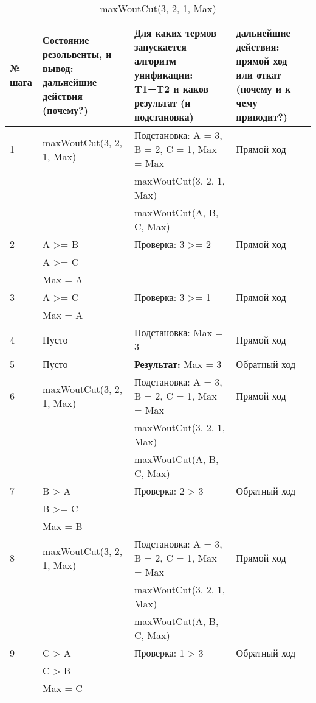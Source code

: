 {
\small
\begin{longtable}{|p{1.15cm}|p{4cm}|p{6cm}|p{6cm}|}
    \caption{maxWoutCut(3, 2, 1, Max)} \\
    \hline
    № шага & Состояние резольвенты, и вывод: дальнейшие действия (почему?) & Для каких термов запускается алгоритм унификации: T1=T2 и каков результат (и подстановка) & дальнейшие действия: прямой ход или откат (почему и к чему приводит?) \\
    \hline
    1 & maxWoutCut(3, 2, 1, Max) & Подстановка: A = 3, B = 2, C = 1, Max = Max & Прямой ход \\
      & & maxWoutCut(3, 2, 1, Max) & \\
      & & maxWoutCut(A, B, C, Max) & \\
    \hline
    2 & A >= B & Проверка: 3 >= 2 & Прямой ход \\
      & A >= C & & \\
      & Max = A & & \\
    \hline
    3 & A >= C & Проверка: 3 >= 1 & Прямой ход \\
      & Max = A & & \\
    \hline
    4 & Пусто & Подстановка: Max = 3 & Прямой ход \\
    \hline
    5 & Пусто & \textbf{Результат:} Max = 3 & Обратный ход \\
    \hline
    6 & maxWoutCut(3, 2, 1, Max) & Подстановка: A = 3, B = 2, C = 1, Max = Max & Прямой ход \\
      & & maxWoutCut(3, 2, 1, Max) & \\
      & & maxWoutCut(A, B, C, Max) & \\
    \hline
    7 & B > A & Проверка: 2 > 3 & Обратный ход \\
      & B >= C & & \\
      & Max = B & & \\
    \hline
    8 & maxWoutCut(3, 2, 1, Max) & Подстановка: A = 3, B = 2, C = 1, Max = Max & Прямой ход \\
      & & maxWoutCut(3, 2, 1, Max) & \\
      & & maxWoutCut(A, B, C, Max) & \\
    \hline
    9 & C > A & Проверка: 1 > 3 & Обратный ход \\
      & C > B & & \\
      & Max = C & & \\
    \hline
\end{longtable}
}
